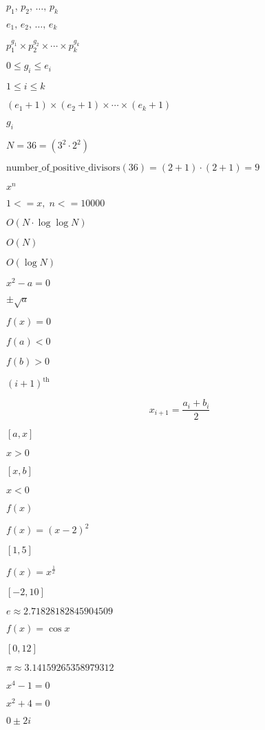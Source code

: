 \documentclass{article}
\begin{document}
$p_1,\, p_2,\, \dots,\, p_k$
\pagebreak

$e_1,\, e_2,\, \dots,\, e_k$
\pagebreak

$p_1^{g_1}\times p_2^{g_2}\times\cdots\times p_k^{g_k}$
\pagebreak

$0\le g_i\le e_i$
\pagebreak

$1\le i\le k$
\pagebreak

$(e_1+1) \times (e_2+1)\times\cdots\times (e_k+1)$
\pagebreak

$g_i$
\pagebreak

$N = 36 = (3^2 \cdot 2^2)$
\pagebreak

$\mbox{number_of_positive_divisors}(36) = (2+1) \cdot (2+1) = 9$
\pagebreak

$x^n$
\pagebreak

$1 <= x,\; n <= 10000$
\pagebreak

$O(N \cdot\log \log N)$
\pagebreak

$O(N)$
\pagebreak

$O(\log
N)$
\pagebreak

$x^2-a=0$
\pagebreak

$\pm\sqrt{a}$
\pagebreak

$f(x)=0$
\pagebreak

$f(a)<0$
\pagebreak

$f(b)>0$
\pagebreak

$(i+1)^\text{th}$
\pagebreak

\[
x_{i+1} = \frac{a_i+b_i}{2}
\]
\pagebreak

$[a,x]$
\pagebreak

$x>0$
\pagebreak

$[x,b]$
\pagebreak

$x<0$
\pagebreak

$f(x)$
\pagebreak

$f(x)= (x-2)^2$
\pagebreak

$[1,5]$
\pagebreak

$f(x)= x^{\frac{1}{x}}$
\pagebreak

$[-2,10]$
\pagebreak

$e\approx 2.71828182845904509$
\pagebreak

$f(x)= \cos x$
\pagebreak

$[0,12]$
\pagebreak

$\pi\approx 3.14159265358979312$
\pagebreak

$x^4-1=0$
\pagebreak

$x^2+4=0$
\pagebreak

$0 \pm 2i$
\pagebreak
\end{document}
